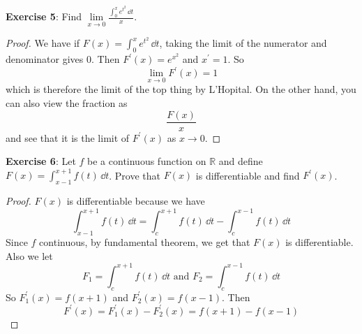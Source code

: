 \documentclass{article}
\begin{document}
\textbf{Exercise 5}: Find $\lim\limits_{x \to 0}\frac{\int_{0}^{x} e^{t^{2}} \, \dd{t} }{x}$.
    \begin{proof}
        We have if $F(x) = \int_{0}^{x} e^{t^{2}} \, \dd{t} $, taking the limit of the numerator and denominator gives $0$. Then $F^{\prime}(x) = e^{x^{2}}$ and $x^{\prime} = 1$. So 
            \begin{equation*}
                \lim\limits_{x \to 0}F^{\prime}(x) = 1
            \end{equation*}
        which is therefore the limit of the top thing by L'Hopital. On the other hand, you can also view the fraction as 
            \begin{equation*}
                \dfrac{F(x)}{x}
            \end{equation*}
        and see that it is the limit of $F^{\prime}(x)$ as $x \rightarrow 0$.
    \end{proof}

\textbf{Exercise 6}: Let $f$ be a continuous function on $\mathbb{R}$ and define $F(x) = \int_{x - 1}^{x + 1} f(t) \, \dd{t} $. Prove that $F(x)$ is differentiable and find $F^{\prime}(x)$.
    \begin{proof}
        $F(x)$ is differentiable because we have 
            \begin{equation*}
                \int_{x - 1}^{x + 1} f(t) \, \dd{t}  = \int_{c}^{x + 1} f(t) \, \dd{t}  - \int_{c}^{x - 1} f(t) \, \dd{t} 
            \end{equation*}
        Since $f$ continuous, by fundamental theorem, we get that $F(x)$ is differentiable. Also we let 
            \begin{equation*}
                F_{1} = \int_{c}^{x + 1} f(t) \, \dd{t} \text{ and } F_{2} = \int_{c}^{x - 1} f(t) \, \dd{t} 
            \end{equation*}
        So $F_{1}^{\prime}(x) = f(x + 1)$ and $F_{2}^{\prime}(x) = f(x - 1)$. Then 
            \begin{equation*}
                F^{\prime}(x) = F_{1}^{\prime}(x) - F_{2}^{\prime}(x) = f(x + 1) - f(x - 1)
            \end{equation*}
    \end{proof}
\end{document}
